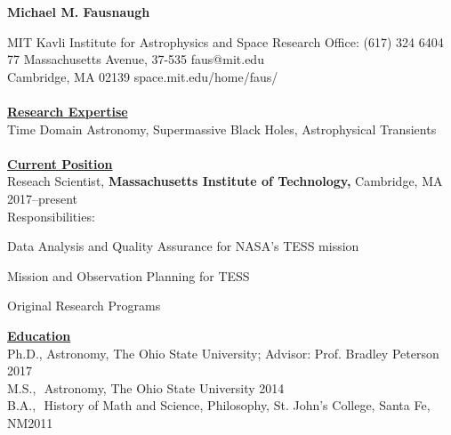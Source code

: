 \documentclass[letterpaper,11pt]{article}
\begin{document}
\begin{center}
\huge\bfseries{Michael M. Fausnaugh}
\end{center}

\noindent MIT Kavli Institute for Astrophysics and Space Research \hfill Office: (617) 324 6404 \\
77 Massachusetts Avenue, 37-535  \hfill faus@mit.edu\\
Cambridge, MA 02139 \hfill space.mit.edu/home/faus/
\\
\\
\underline{\textbf{Research Expertise}}\\
Time Domain Astronomy, Supermassive Black Holes, Astrophysical Transients
\\
\\
\underline{\textbf{Current Position}} \\
Reseach Scientist, \textbf{Massachusetts Institute of Technology,} Cambridge, MA \hfill 2017--present\\
Responsibilities: \begin{compactitem}
   \item Data Analysis and Quality Assurance for NASA's TESS mission
   \item Mission and Observation Planning for TESS
   \item Original Research Programs
   \end{compactitem}	
\underline{\textbf{Education}}    \\
Ph.D., Astronomy, The Ohio State University;  Advisor:  Prof. Bradley Peterson \hfill 2017\\
M.S.,  \,\,Astronomy, The Ohio State University \hfill 2014\\
B.A., \,\,History of Math and Science, Philosophy, St. John's College, Santa Fe, NM\hfill 2011\\
\end{document}
